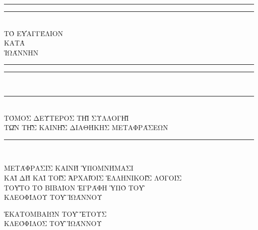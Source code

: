 \begin{doubletitle}
    \textheight
    \centering
    \vspace*{\baselineskip}
    \rule{\textwidth}{1.6pt}\vspace*{-\baselineskip}\vspace*{2pt}
    \rule{\textwidth}{0.4pt}\\[\baselineskip]
    {\uppercase{\LARGE Τὸ εὐαγγέλιον \\ κατὰ \\[0.3\baselineskip] Ἰωάννην }}\\[0.2\baselineskip]
    \rule{\textwidth}{0.4pt}\vspace*{-\baselineskip}\vspace{3.2pt}
    \rule{\textwidth}{1.6pt}\\
    
    \scshape
    \rule{\textwidth}{0.4pt}\\[\baselineskip]
    {\Large\uppercase{Τόμος δεύτερος τῇ συλλογῇ \\ τῶν τῆς Καινῆς Διαθήκης μεταφράσεων } }\\[0.2\baselineskip]
    \rule{\textwidth}{0.4pt}\vspace*{-\baselineskip}\vspace{3.2pt}\\[\baselineskip]\vspace*{2\baselineskip}
    
    \uppercase{Μετάφρασις καινὴ ὑπομνήμασι \\
    καὶ δὴ καὶ τοῖς ἀρχαῖοις Ἑλληνικοῖς λόγοις} \\ 
    \vspace*{2\baselineskip}  
    \uppercase{Τοῦτο τὸ βιβλίον ἐγράφη ὑπὸ τοῦ \\[\baselineskip]
    {\Large Κλεοφίλου τοῦ Ἰωάννου}}\par
    \vfill
    {\scshape \uppercase{Ἑκατομβαιών τοῦ} } \uppercase{ἔτους}  \\
    {\large \uppercase{Κλεόφιλος τοῦ Ἰωάννου}}\par
\end{doubletitle}